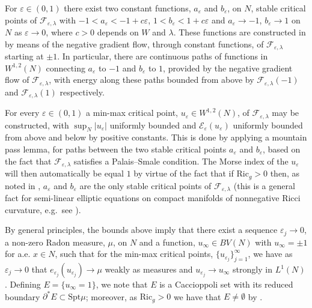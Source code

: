 \documentclass[11pt]{article}
\begin{document}
\bigskip

For $\varepsilon \in (0,1)$ there exist two constant functions, $a_\varepsilon$ and $b_\varepsilon$, on $N$, stable critical points of $\mathcal{F}_{\varepsilon,\lambda}$ with $-1 < a_\varepsilon < -1 + c\varepsilon$, $1 < b_\varepsilon < 1 + c\varepsilon$ and $a_\varepsilon \rightarrow -1$, $b_\varepsilon \rightarrow 1$ on $N$ as $\varepsilon \rightarrow 0$, where $c > 0$ depends on $W$ and $\lambda$. These functions are constructed in \cite[Section 5]{bellettini-wickramasekera} by means of the negative gradient flow, through constant functions, of $\mathcal{F}_{\varepsilon,\lambda}$ starting at $\pm 1$. In particular, there are continuous paths of functions in $W^{1,2}(N)$ connecting $a_\varepsilon$ to $-1$ and $b_\varepsilon$ to $1$, provided by the negative gradient flow of $\mathcal{F}_{\varepsilon,\lambda}$, with energy along these paths bounded from above by $\mathcal{F}_{\varepsilon,\lambda}(-1)$ and $\mathcal{F}_{\varepsilon,\lambda}(1)$ respectively.

\bigskip

For every $\varepsilon \in (0,1)$ a min-max critical point, $u_{\varepsilon} \in W^{1,2}(N)$,
of $\mathcal{F}_{\varepsilon,\lambda}$ may be constructed, with $\sup_N |u_{\varepsilon}|$ uniformly bounded and $\mathcal{E}_{\varepsilon}(u_{\varepsilon})$ uniformly bounded from above and below by positive constants. This is done by applying a mountain pass lemma, for paths between the two stable critical points $a_\varepsilon$ and $b_\varepsilon$, based
on the fact that $\mathcal{F}_{\varepsilon,\lambda}$ satisfies a Palais–Smale condition. The Morse index of the $u_{\varepsilon}$
will then automatically be equal $1$ by virtue of the fact that if $\mathrm{Ric}_g > 0$ then, as noted in \cite[Remark 6.7]{bellettini-wickramasekera}, $a_\varepsilon$ and $b_\varepsilon$ are the only stable critical points of $\mathcal{F}_{\varepsilon,\lambda}$ (this is a general fact for semi-linear elliptic equations on compact
manifolds of nonnegative Ricci curvature, e.g.~see \cite{Jimbo1984}).

\bigskip

By general principles, the bounds above imply
that there exist a sequence $\varepsilon_j \rightarrow 0$, a non-zero Radon measure, $\mu$, on $N$ and a function, $u_\infty \in BV(N)$
with $u_\infty = \pm 1$ for a.e. $x \in N$, such that for the min-max critical points, $\{u_{\varepsilon_j}\}_{j = 1}^\infty$, we have as $\varepsilon_j \rightarrow 0$ that $e_{\varepsilon_j}(u_{\varepsilon_j}) \rightarrow \mu$
weakly as measures and $u_{\varepsilon_j} \rightarrow u_{\infty}$ strongly in $L^1(N)$. Defining $E = \{ u_\infty = 1 \}$, we note that $E$ is a Caccioppoli set with its reduced boundary $\partial^* E \subset \mathrm{Spt}\mu$; moreover, as $\mathrm{Ric}_g > 0$ we have that $E \neq \emptyset$ by \cite[Remark 6.7]{bellettini-wickramasekera}.
\end{document}
